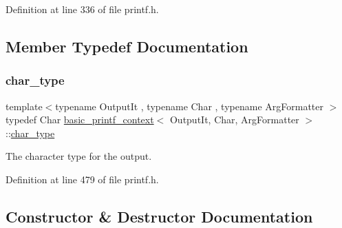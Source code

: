 Definition at line 336 of file printf.\+h.



\subsection{Member Typedef Documentation}
\mbox{\label{classbasic__printf__context_a7f19ba5dfbcd66a87281c4b05bcf324e}} 
\subsubsection{\texorpdfstring{char\+\_\+type}{char\_type}}
{\footnotesize\ttfamily template$<$typename Output\+It , typename Char , typename Arg\+Formatter $>$ \\
typedef Char \hyperlink{classbasic__printf__context}{basic\+\_\+printf\+\_\+context}$<$ Output\+It, Char, Arg\+Formatter $>$\+::\hyperlink{classbasic__printf__context_a7f19ba5dfbcd66a87281c4b05bcf324e}{char\+\_\+type}}

The character type for the output. 

Definition at line 479 of file printf.\+h.



\subsection{Constructor \& Destructor Documentation}
\mbox{\label{classbasic__printf__context_ae71967bec500702473ba5b98d4e36aa2}} 
